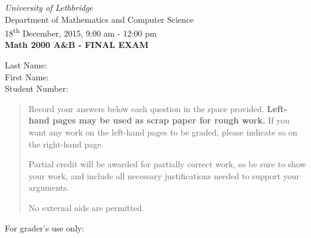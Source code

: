 \documentclass[12pt]{article}
\newcommand{\skipline}{\vspace{12pt}}
\begin{document}
\author{Instructor: Sean Fitzpatrick}
\thispagestyle{plain}
\begin{center}
\emph{University of Lethbridge}\\
Department of Mathematics and Computer Science\\
18\textsuperscript{th} December, 2015, 9:00 am - 12:00 pm\\
{\bf Math 2000 A\&B - FINAL EXAM}\\
\end{center}
\skipline \skipline \skipline \noindent \skipline
Last Name:\underline{\hspace{350pt}}\\
\skipline
First Name:\underline{\hspace{348pt}}\\
\skipline
Student Number:\underline{\hspace{322pt}}\\


\vspace{0.5in}


\begin{quote}
 Record your answers below each question in the space provided.    {\bf Left-hand pages may be used as scrap paper for rough work.}  If you want any work on the left-hand pages to be graded, please indicate so on the right-hand page.
 
 \bigskip
 
Partial credit will be awarded for partially correct work, so be sure to show your work, and include all necessary justifications needed to support your arguments.

No external aids are permitted.
\end{quote}


\vspace{0.5in}

For grader's use only:
\end{document}
